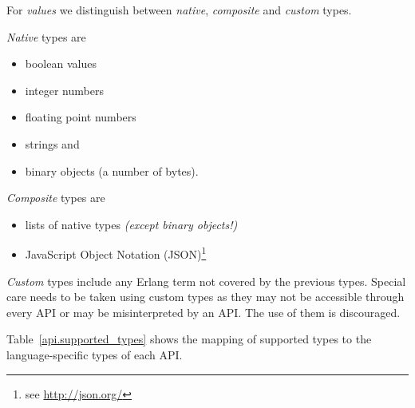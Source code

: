 \documentclass[a4paper]{scrreprt}
\begin{document}
For \emph{values} we distinguish between \emph{native}, \emph{composite}
and \emph{custom} types.

\emph{Native} types are
\begin{itemize}
  \item boolean values
  \item integer numbers
  \item floating point numbers
  \item strings and
  \item binary objects (a number of bytes).
\end{itemize}

\emph{Composite} types are
\begin{itemize}
  \item lists of native types \emph{(except binary objects!)}
  \item JavaScript Object Notation (JSON)\footnote{see \url{http://json.org/}}
\end{itemize}

\emph{Custom} types include any Erlang term not covered by the previous types.
Special care needs to be taken using custom types as they may not be accessible
through every API or may be misinterpreted by an API. The use of them is
discouraged.

Table~\ref{api.supported_types} shows the mapping of supported types to the
language-specific types of each API.
\end{document}
